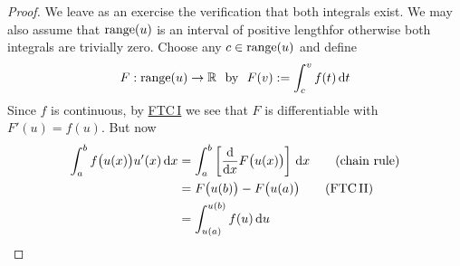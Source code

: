  

\begin{proof}
We leave as an exercise the verification that both integrals exist. We may also assume that $\operatorname{range}(u)$ is an interval of positive length\footnotemark for otherwise both integrals are trivially zero.\smallbreak
Choose any $c\in\operatorname{range}(u)$ and define
\[F:\range(u)\to\R\ \text{ by }\ F(v):=\int_c^vf(t)\,\dt\]
Since $f$ is continuous, by \hyperref[thm:ftc1]{FTC\,I} we see that $F$ is differentiable with $F'(u)=f(u)$. But now
\begin{align*}
\int_a^b f\bigl(u(x)\bigr)u'(x)\,{\mathrm{d} x} &=\int_a^b \left[\frac{\mathrm{d} }{\mathrm{d} x}F\bigl(u(x)\bigr)\right]\,{\mathrm{d} x}  \tag{chain rule}\\
&= F\bigl(u(b)\bigr)-F\bigl(u(a)\bigr) \tag{FTC\,II}\\
&=\int_{u(a)}^{u(b)}f(u)\,{\mathrm{d} u}\tag*{\qedhere}
\end{align*}
\end{proof}



